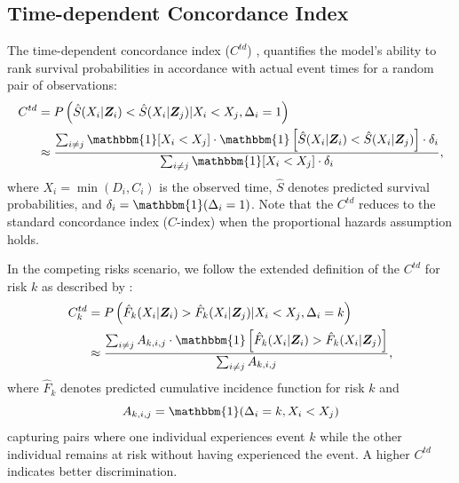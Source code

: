\documentclass{article}
\theoremstyle{plain}
\theoremstyle{definition}
\theoremstyle{remark}
\begin{document}
\subsection{Time-dependent Concordance Index}
The time-dependent concordance index ($C^{td}$) \citep{antolini2005time}, quantifies the model’s ability to rank survival probabilities in accordance with actual event times for a random
pair of observations:
\begin{equation}
\begin{aligned}
C^{td} 
    & = P\left(\hat{S}(X_i|\bm{Z}_i) < \hat{S}(X_i|\bm{Z}_j) | X_i<X_j, \Delta_i=1 \right) \\ 
    &\approx \frac{\sum_{i \neq j} \mathbbm{1}[X_i<X_j] \cdot \mathbbm{1}\left[\hat{S}(X_i|\bm{Z}_i) < \hat{S}(X_i|\bm{Z}_j)\right] \cdot \delta_i}{\sum_{i \neq j} \mathbbm{1}[X_i<X_j] \cdot \delta_i},
\end{aligned}
\end{equation}
where $X_i = \min(D_i, C_i)$ is the observed time, $\hat{S}$ denotes predicted survival probabilities, and $\delta_i = \mathbbm{1}(\Delta_i=1)$.
Note that the $C^{td}$ reduces to the standard concordance index ($C$-index) \citep{harrell1982evaluating} when the proportional hazards assumption holds.

In the competing risks scenario, we follow the extended definition of the $C^{td}$ for risk $k$ as described by \cite{lee2018deephit}:
\begin{equation}
\begin{aligned}
C^{td}_k 
    & = P\left(\hat{F}_k(X_i|\bm{Z}_i) > \hat{F}_k(X_i|\bm{Z}_j) | X_i<X_j, \Delta_i=k \right) \\ 
    &\approx \frac{\sum_{i \neq j} A_{k,i,j} \cdot \mathbbm{1}\left[\hat{F}_k(X_i|\bm{Z}_i) > \hat{F}_k(X_i|\bm{Z}_j)\right]}{\sum_{i \neq j} A_{k,i,j}},
\end{aligned}
\end{equation}
where $\hat{F}_k$ denotes predicted cumulative incidence function for risk $k$ and
\begin{equation}
    A_{k,i,j} = \mathbbm{1}(\Delta_i=k, X_i<X_j)
\end{equation}
capturing pairs where one individual experiences event $k$ while the other individual remains at risk without having experienced the event. 
A higher $C^{td}$ indicates better discrimination.
\end{document}
